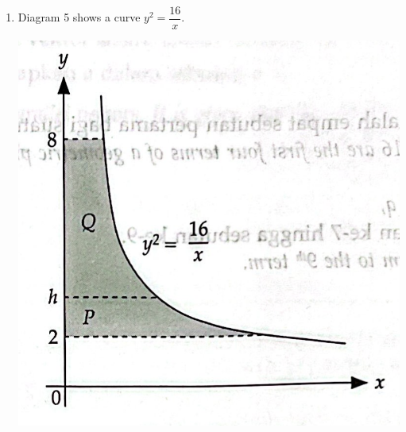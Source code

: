 \documentclass{report}
\newcommand{\sol}{\textbf{Solution:}}
\begin{document}
\begin{enumerate}[leftmargin=*]
\begin{enumerate}
\begin{enumerate}
                              \sol{}
                              \begin{align*}
                                  \int_1^3 \dfrac{5 h(x)}{2} d x & = \dfrac{5}{2} \int_1^3 h(x) d x \\
                                                                 & = \dfrac{5}{2} m
                              \end{align*}

                        \item  $\displaystyle\int_1^3[6 x+2 h(x)] d x$.

                              \sol{}
                              \begin{align*}
                                  \int_1^3[6 x+2 h(x)] d x & = \int_1^3 6 x d x + \int_1^3 2 h(x) d x          \\
                                                           & = 6 \int_1^3 x d x + 2 \int_1^3 h(x) d x          \\
                                                           & = 6 \left[\dfrac{x^2}{2}\right]_1^3 + 2m          \\
                                                           & = 6 \left[\dfrac{9}{2} - \dfrac{1}{2}\right] + 2m \\
                                                           & = 24 + 2m
                              \end{align*}
                    \end{enumerate}
              \item Diagram 5 shows a curve $y^2=\dfrac{16}{x}$.
                    \begin{center}
                        \includegraphics[scale=0.25]{assets/p1.14b.png}
                    \end{center}


\end{enumerate}
\end{enumerate}
\end{document}
